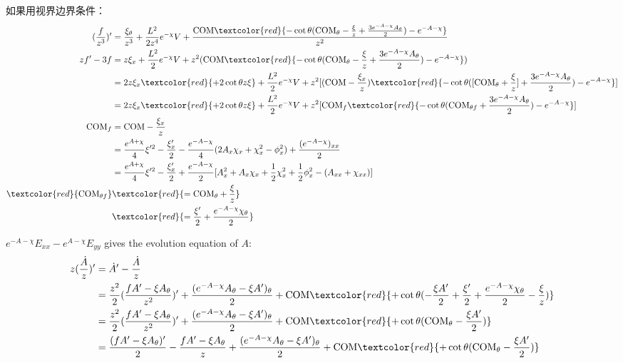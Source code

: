 \documentclass[12pt,a4paper]{ctexart}
\numberwithin{equation}{section}
\begin{document}
如果用视界边界条件：
\begin{equation}
    \begin{aligned}
        (\frac{f}{z^{3}})^{\prime}&=\frac{\xi_{\theta}}{z^{3}}+\frac{L^{2}}{2z^{4}}e^{-\chi}V+\frac{\mathrm{COM}\textcolor{red}{-\cot\theta(\mathrm{COM}_\theta-\frac{\xi}{z}+\frac{3e^{-A-\chi}A_\theta}{2})-e^{-A-\chi}}}{z^{2}}\\
        zf'-3f&=z\xi_{x}+\frac{L^{2}}{2}e^{-\chi}V+z^2(\mathrm{COM}\textcolor{red}{-\cot\theta(\mathrm{COM}_\theta-\frac{\xi}{z}+\frac{3e^{-A-\chi}A_\theta}{2})-e^{-A-\chi}})\\
        &=2z\xi_{x}\textcolor{red}{+2\cot\theta z\xi}+\frac{L^{2}}{2}e^{-\chi}V+z^2[(\mathrm{COM}-\frac{\xi_x}{z})\textcolor{red}{-\cot\theta([\mathrm{COM}_\theta+\frac{\xi}{z}]+\frac{3e^{-A-\chi}A_\theta}{2})-e^{-A-\chi}}]\\
        &=2z\xi_{x}\textcolor{red}{+2\cot\theta z\xi}+\frac{L^{2}}{2}e^{-\chi}V+z^2[\mathrm{COM}_f\textcolor{red}{-\cot\theta(\mathrm{COM}_{\theta f}+\frac{3e^{-A-\chi}A_\theta}{2})-e^{-A-\chi}}]\\
        \mathrm{COM}_f&=\mathrm{COM}-\frac{\xi_x}{z}\\
        &=\frac{e^{A+\chi}}{4}\xi^{\prime2}-\frac{\xi_{x}^{\prime}}{2}-\frac{e^{-A-\chi}}{4}(2A_x\chi_x+\chi_{x}^2-\phi_x^2)+\frac{(e^{-A-\chi})_{xx}}{2}\\
        &=\frac{e^{A+\chi}}{4}\xi^{\prime2}-\frac{\xi_{x}^{\prime}}{2}+\frac{e^{-A-\chi}}{2}[A_x^2+A_x\chi_x+\frac{1}{2}\chi_{x}^2+\frac{1}{2}\phi_x^2-(A_{xx}+\chi_{xx})]\\
        \textcolor{red}{\mathrm{COM}_{\theta f}}&\textcolor{red}{=\mathrm{COM}_\theta+\frac{\xi}{z}}\\
        &\textcolor{red}{=\frac{\xi'}{2}+\frac{e^{-A-\chi}\chi_\theta}{2}}
    \end{aligned}
\end{equation}

$e^{-A-\chi}E_{xx}-e^{A-\chi}E_{yy}$ gives the evolution equation of $A$:
\begin{equation}
    \begin{aligned}
        z(\frac{\dot{A}}{z})^{\prime}&=\dot{A}^{\prime}-\frac{\dot{A}}{z}\\
        &=\frac{z^{2}}{2}(\frac{fA^{\prime}-\xi A_{\theta}}{z^{2}})^{\prime}+\frac{(e^{-A-\chi}A_{\theta}-\xi A^{\prime})_{\theta}}{2}+\mathrm{COM}\textcolor{red}{+\cot\theta(-\frac{\xi A'}{2}+\frac{\xi'}{2}+\frac{e^{-A-\chi}\chi_\theta}{2}-\frac{\xi}{z})}\\
        &=\frac{z^{2}}{2}(\frac{fA^{\prime}-\xi A_{\theta}}{z^{2}})^{\prime}+\frac{(e^{-A-\chi}A_{\theta}-\xi A^{\prime})_{\theta}}{2}+\mathrm{COM}\textcolor{red}{+\cot\theta(\mathrm{COM}_\theta-\frac{\xi A'}{2})}\\
        &=\frac{(fA^{\prime}-\xi A_{\theta})'}{2}-\frac{fA^{\prime}-\xi A_{\theta}}{z}+\frac{(e^{-A-\chi}A_{\theta}-\xi A^{\prime})_{\theta}}{2}+\mathrm{COM}\textcolor{red}{+\cot\theta(\mathrm{COM}_\theta-\frac{\xi A'}{2})}
    \end{aligned}
\end{equation}
\end{document}

